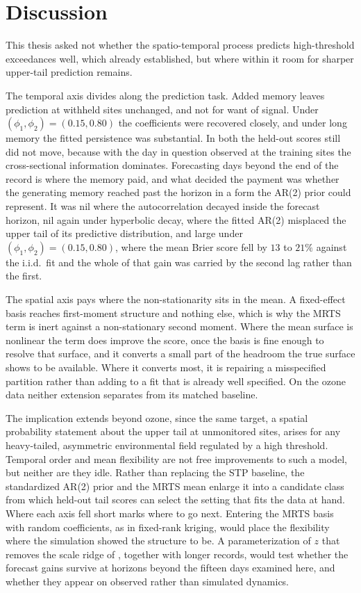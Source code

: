 \documentclass[12pt]{article}
\begin{document}
\FloatBarrier
\section{Discussion}\label{sec:discussion}

This thesis asked not whether the spatio-temporal \skewt process predicts
high-threshold exceedances well, which \textcite{morris_space-time_2017} already
established, but where within it room for sharper upper-tail prediction
remains.

The temporal axis divides along the prediction task.  Added memory leaves
prediction at withheld sites unchanged, and not for want of signal.  Under
$(\phi_1, \phi_2) = (0.15, 0.80)$ the coefficients were recovered closely, and
under long memory the fitted persistence was substantial.  In both the held-out
scores still did not move, because with the day in question observed at the
training sites the cross-sectional information dominates.  Forecasting days
beyond the end of the record is where the memory paid, and what decided the
payment was whether the generating memory reached past the horizon in a form
the AR(2) prior could represent.  It was nil where the autocorrelation decayed
inside the forecast horizon, nil again under hyperbolic decay, where the fitted
AR(2) misplaced the upper tail of its predictive distribution, and large under
$(\phi_1, \phi_2) = (0.15, 0.80)$, where the mean Brier score fell by $13$ to
$21\%$ against the i.i.d.\ fit and the whole of that gain was carried by the
second lag rather than the first.

The spatial axis pays where the non-stationarity sits in the mean.  A
fixed-effect basis reaches first-moment structure and nothing else, which is
why the MRTS term is inert against a non-stationary second moment.  Where the
mean surface is nonlinear the term does improve the score, once the basis is
fine enough to resolve that surface, and it converts a small part of the
headroom the true surface shows to be available.  Where it converts most, it is
repairing a misspecified partition rather than adding to a fit that is already
well specified.  On the ozone data neither extension separates from its
matched baseline.

The implication extends beyond ozone, since the same target, a spatial
probability statement about the upper tail at unmonitored sites, arises for any
heavy-tailed, asymmetric environmental field regulated by a high threshold.
Temporal order and mean flexibility are not free improvements to such a model,
but neither are they idle.  Rather than replacing the STP baseline, the
standardized AR(2) prior and the MRTS mean enlarge it into a candidate class
from which held-out tail scores can select the setting that fits the data at
hand.  Where each axis fell short marks where to go next.  Entering the MRTS
basis with random coefficients, as in fixed-rank kriging, would place the
flexibility where the simulation showed the structure to be.  A
parameterization of $z$ that removes the scale ridge of
, together with longer records, would test whether the
forecast gains survive at horizons beyond the fifteen days examined here, and
whether they appear on observed rather than simulated dynamics.
\end{document}
